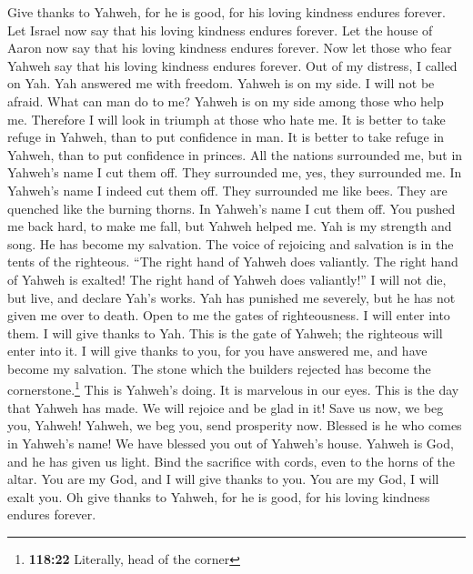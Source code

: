  Give thanks to Yahweh, for he is good, for his loving
kindness endures forever.  Let Israel now say that his
loving kindness endures forever.  Let the house of Aaron
now say that his loving kindness endures forever.  Now let
those who fear Yahweh say that his loving kindness endures forever.
 Out of my distress, I called on Yah. Yah answered me with
freedom.  Yahweh is on my side. I will not be afraid. What
can man do to me?  Yahweh is on my side among those who
help me. Therefore I will look in triumph at those who hate me.
 It is better to take refuge in Yahweh, than to put
confidence in man.  It is better to take refuge in Yahweh,
than to put confidence in princes.  All the nations
surrounded me, but in Yahweh's name I cut them off.  They
surrounded me, yes, they surrounded me. In Yahweh's name I indeed cut
them off.  They surrounded me like bees. They are
quenched like the burning thorns. In Yahweh's name I cut them off.
 You pushed me back hard, to make me fall, but Yahweh
helped me.  Yah is my strength and song. He has become my
salvation.  The voice of rejoicing and salvation is in
the tents of the righteous. ``The right hand of Yahweh does valiantly.
 The right hand of Yahweh is exalted! The right hand of
Yahweh does valiantly!''  I will not die, but live, and
declare Yah's works.  Yah has punished me severely, but
he has not given me over to death.  Open to me the gates
of righteousness. I will enter into them. I will give thanks to Yah.
 This is the gate of Yahweh; the righteous will enter
into it.  I will give thanks to you, for you have
answered me, and have become my salvation.  The stone
which the builders rejected has become the cornerstone.\footnote{\textbf{118:22}
  Literally, head of the corner}  This is Yahweh's doing.
It is marvelous in our eyes.  This is the day that Yahweh
has made. We will rejoice and be glad in it!  Save us
now, we beg you, Yahweh! Yahweh, we beg you, send prosperity now.
 Blessed is he who comes in Yahweh's name! We have
blessed you out of Yahweh's house.  Yahweh is God, and he
has given us light. Bind the sacrifice with cords, even to the horns of
the altar.  You are my God, and I will give thanks to
you. You are my God, I will exalt you.  Oh give thanks to
Yahweh, for he is good, for his loving kindness endures forever.

